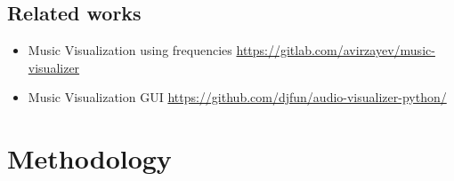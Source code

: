 \documentclass{article}
\begin{document}
\subsection{Related works}

\begin{itemize}
    \item Music Visualization using frequencies \url{https://gitlab.com/avirzayev/music-visualizer}
    \item Music Visualization GUI \url{https://github.com/djfun/audio-visualizer-python/}
    
\end{itemize}




\iffalse 
TODO:
-get the 15 minimum references (cur: 14)
    -add datasets to references (thank god this helps pad our count lol)
-add more to abstract section (150 words ish?)
-fill in Ethan Huang stuff in roles
    - yea idk what to put there lmao
    
potential todo (maybe not necessary):
- how tf are we supposed to "... describe the ... associate literature that the group is going to use for the project".
    - hard to do for all 15 total references..
    - idk if this is intended to have an entire section to describe how we are going to use each paper because that would seem weird
-add more specificity and precision to roles
    -hard to think of so early in the project
    -hard to balance quantity and difficulty and order or tasks between each member
    -specific objectives for project?
\fi

\break

\section{Methodology}

\end{document}
